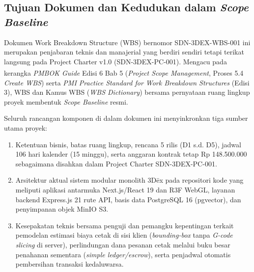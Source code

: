 \documentclass[11pt,a4paper]{article}
\begin{document}
\subsection{Tujuan Dokumen dan Kedudukan dalam \textit{Scope Baseline}}
Dokumen Work Breakdown Structure (WBS) bernomor SDN-3DEX-WBS-001 ini merupakan penjabaran teknis dan manajerial yang berdiri sendiri tetapi terikat langsung pada Project Charter v1.0 (SDN-3DEX-PC-001). Mengacu pada kerangka \textit{PMBOK\textsuperscript{\textregistered} Guide} Edisi 6 Bab 5 (\textit{Project Scope Management}, Proses 5.4 \textit{Create WBS}) serta \textit{PMI Practice Standard for Work Breakdown Structures} (Edisi 3), WBS dan Kamus WBS (\textit{WBS Dictionary}) bersama pernyataan ruang lingkup proyek membentuk \textit{Scope Baseline} resmi.

Seluruh rancangan komponen di dalam dokumen ini menyinkronkan tiga sumber utama proyek:
\begin{enumerate}[leftmargin=1.5em, itemsep=1.5pt]
    \item Ketentuan bisnis, batas ruang lingkup, rencana 5 rilis (D1 s.d. D5), jadwal 106 hari kalender (15 minggu), serta anggaran kontrak tetap Rp 148.500.000 sebagaimana disahkan dalam Project Charter SDN-3DEX-PC-001.
    \item Arsitektur aktual sistem modular monolith 3D\={e}x pada repositori kode yang meliputi aplikasi antarmuka Next.js/React 19 dan R3F WebGL, layanan backend Express.js 21 rute API, basis data PostgreSQL 16 (pgvector), dan penyimpanan objek MinIO S3.
    \item Kesepakatan teknis bersama penguji dan pemangku kepentingan terkait pemodelan estimasi biaya cetak di sisi klien (\textit{bounding-box} tanpa \textit{G-code slicing} di server), perlindungan dana pesanan cetak melalui buku besar penahanan sementara (\textit{simple ledger/escrow}), serta penjadwal otomatis pembersihan transaksi kedaluwarsa.
\end{enumerate}
\end{document}
